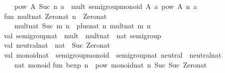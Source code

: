 \begin{isabellebody}
\begin{isamarkuptext}
\ \ {}\ pow\ A{}\ {}Suc\ n{}\ a\ {}\ mult\ {}semigroup{}monoid\ A{}{}\ a\ {}pow\ A{}\ n\ a{}{}\isanewline
\isanewline
fun\ mult{}nat\ Zero{}nat\ n\ {}\ Zero{}nat\isanewline
\ \ {}\ mult{}nat\ {}Suc\ m{}\ n\ {}\ plus{}nat\ n\ {}mult{}nat\ m\ n{}{}\isanewline
\isanewline
val\ semigroup{}nat\ {}\ {}mult\ {}\ mult{}nat{}\ {}\ nat\ semigroup{}\isanewline
\isanewline
val\ neutral{}nat\ {}\ nat\ {}\ Suc\ Zero{}nat{}\isanewline
\isanewline
val\ monoid{}nat\ {}\ {}semigroup{}monoid\ {}\ semigroup{}nat{}\ neutral\ {}\ neutral{}nat{}\isanewline
\ \ {}\ nat\ monoid{}\isanewline
\isanewline
fun\ bexp\ n\ {}\ pow\ monoid{}nat\ n\ {}Suc\ {}Suc\ Zero{}nat{}{}{}\isanewline

\end{isamarkuptext}
\end{isabellebody}
